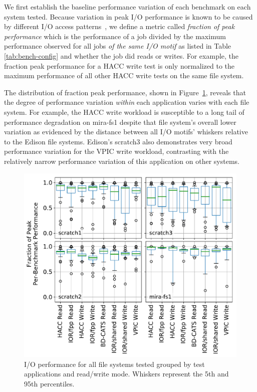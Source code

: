 We first establish the baseline performance variation of each benchmark on each system tested.
Because variation in peak I/O performance is known to be caused by different I/O access patterns~\cite{Lofstead2010,Uselton2010,Xie2012}, 
we define a metric called \emph{fraction of peak performance} which is the performance of a job divided by the maximum performance observed for all jobs \emph{of the same I/O motif} as listed in Table \ref{tab:bench-config} and whether the job did reads or writes.
For example, the fraction peak performance for a HACC write test is only normalized to the maximum performance of all other HACC write tests on the same file system.

The distribution of fraction peak performance, shown in Figure~\ref{fig:perf-summary-boxplots-motif}, reveals that the degree of performance variation \emph{within} each application varies with each file system.
For example, the HACC write workload is susceptible to a long tail of performance degradation on mira-fs1 despite that file system's overall lower variation as evidenced by the distance between all I/O motifs' whiskers relative to the Edison file systems.
Edison's scratch3 also demonstrates very broad performance variation for the VPIC write workload, contrasting with the relatively narrow performance variation of this application on other systems.

\begin{figure}[t]
    \centering
    \includegraphics[width=1.0\columnwidth]{figs/perf-boxplots.pdf}
    \caption{I/O performance for all file systems tested grouped by test
    applications and read/write mode.  Whiskers represent the 5th and 95th
    percentiles.}
    \label{fig:perf-summary-boxplots-motif}
\vspace{-.2in}
\end{figure}


